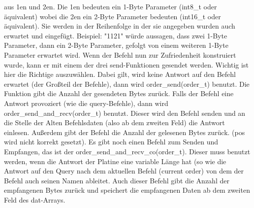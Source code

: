\documentclass[a4paper]{article}
\begin{document}
	aus 1en und 2en. Die 1en bedeuten ein 1-Byte Parameter (int8\_t oder äquivalent) wobei die 2en ein 2-Byte
	Parameter bedeuten (int16\_t oder äquivalent). Sie werden in der Reihenfolge in der sie angegeben wurden auch erwartet
	und eingefügt. Beispiel: "1121" würde aussagen, dass zwei 1-Byte Parameter, dann ein 2-Byte Parameter, gefolgt von
	einem weiteren 1-Byte Parameter erwartet wird.
	Wenn der Befehl nun zur Zufriedenheit konstruiert wurde, kann er mit einem der drei send-Funktionen gesendet werden.
	Wichtig ist hier die Richtige auszuwählen. Dabei gilt, wird keine Antwort auf den Befehl erwartet (der Großteil der
	Befehle), dann wird order\_send(order\_t) benutzt. Die Funktion gibt die Anzahl der gesendeten Bytes zurück.
	Falls der Befehl eine Antwort provoziert (wie die query-Befehle), dann wird order\_send\_and\_recv(order\_t) benutzt.
	Dieser wird den Befehl senden und an die Stelle der Alten Befehlsdaten (also ab dem zweiten Feld) die Antwort einlesen.
	Außerdem gibt der Befehl die Anzahl der gelesenen Bytes zurück. (pos wird nicht korrekt gesetzt).
	Es gibt noch einen Befehl zum Senden und Empfangen, das ist der order\_send\_and\_recv\_co(order\_t). Dieser muss
	benutzt werden, wenn die Antwort der Platine eine variable Länge hat (so wie die Antwort auf den Query nach dem
	aktuellen Befehl (current order) von dem der Befehl auch seinen Namen ableitet. Auch dieser Befehl gibt die Anzahl
	der empfangenen Bytes zurück und speichert die empfangenen Daten ab dem zweiten Feld des dat-Arrays.
\end{document}
